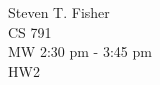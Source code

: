 \documentclass{article}
\newcommand{\src}[1]{}
\begin{document}
	\begin{flushright}
		Steven T. Fisher\\
		CS 791\\
		MW 2:30 pm - 3:45 pm\\
		HW2
	\end{flushright}
\renewcommand\qedsymbol{\ding{110}}
\src{h2q1}
\newpage
\src{h2q2}
\newpage
\src{h2q3}
\newpage
\src{h2q4}
\end{document}

